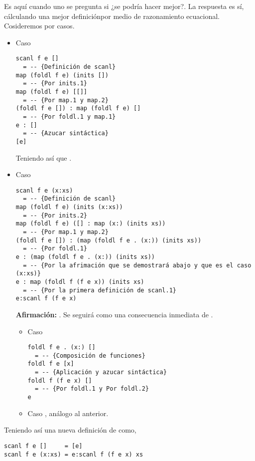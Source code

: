 Es aquí cuando uno se pregunta si ¿se podría hacer mejor?. La respuesta es sí, cálculando una mejor
definiciónpor medio de razonamiento ecuacional. Cosideremos por casos.

\begin{itemize}
\item Caso \hsCode{[]}
\begin{verbatim}
scanl f e []
  = -- {Definición de scanl}
map (foldl f e) (inits [])
  = -- {Por inits.1}
map (foldl f e) [[]]
  = -- {Por map.1 y map.2}
(foldl f e []) : map (foldl f e) []
  = -- {Por foldl.1 y map.1}
e : []
  = -- {Azucar sintáctica}
[e]
\end{verbatim}

Teniendo así que .

\item Caso 
\begin{verbatim}
scanl f e (x:xs)
  = -- {Definición de scanl}
map (foldl f e) (inits (x:xs))
  = -- {Por inits.2}
map (foldl f e) ([] : map (x:) (inits xs))
  = -- {Por map.1 y map.2}
(foldl f e []) : (map (foldl f e . (x:)) (inits xs))
  = -- {Por foldl.1}
e : (map (foldl f e . (x:)) (inits xs))
  = -- {Por la afrimación que se demostrará abajo y que es el caso (x:xs)}
e : map (foldl f (f e x)) (inits xs)
  = -- {Por la primera definición de scanl.1}
e:scanl f (f e x)
\end{verbatim}

\textbf{Afirmación:} . Se seguirá como una consecuencia
inmediata de .

\begin{itemize}
\item Caso 
\begin{verbatim}
foldl f e . (x:) []
  = -- {Composición de funciones}
foldl f e [x]
  = -- {Aplicación y azucar sintáctica}
foldl f (f e x) []
  = -- {Por foldl.1 y Por foldl.2}
e
\end{verbatim}

\item Caso , análogo al anterior.
\end{itemize}
\end{itemize}

Teniendo así una nueva definición de  como,
\begin{verbatim}
scanl f e []     = [e]
scanl f e (x:xs) = e:scanl f (f e x) xs
\end{verbatim}

